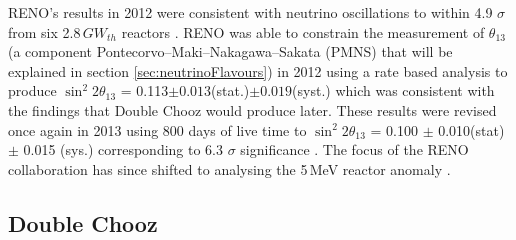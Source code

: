 \begin{figure}[!h]
\begin{minipage}{.45\textwidth}
  \label{fig:RENO_Spectrum}
\end{minipage}
\end{figure}

RENO's results in 2012 were consistent with neutrino oscillations to within 4.9 $\sigma$ from six 2.8\,$GW_{th}$ reactors \cite{reno_may_2012}. RENO was able to constrain the measurement of $\theta_{13}$ (a component Pontecorvo–Maki–Nakagawa–Sakata (PMNS) that will be explained in section \ref{sec:neutrinoFlavours}) in 2012 using a rate based analysis to produce  $\sin^2{2\theta_{13}}$ = 0.113$\pm0.013$(stat.)$\pm0.019$(syst.) which was consistent with the findings that Double Chooz would produce later. These results were revised once again in 2013 using 800 days of live time to $\sin^2{2\theta_{13}}$ = 0.100 $\pm$ 0.010(stat) $\pm$ 0.015 (sys.) corresponding to 6.3 $\sigma$ significance \cite{reno2013}. The focus of the RENO collaboration has since shifted to analysing the 5\,MeV reactor anomaly \cite{reno_may_2019}. 

\subsection{Double Chooz} \label{subSec:doubleChooz}

